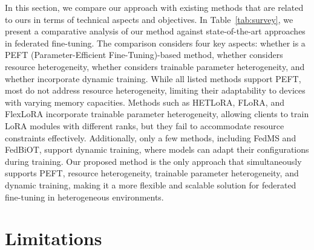 \documentclass[sigconf]{acmart}
\begin{document}
In this section, we compare our approach with existing methods that are related to ours in terms of technical aspects and objectives.
%
%
%
In Table~\ref{tab:survey}, we present a comparative analysis of our method against state-of-the-art approaches in federated fine-tuning. The comparison considers four key aspects: whether is a PEFT (Parameter-Efficient Fine-Tuning)-based method, whether considers resource heterogeneity, whether considers trainable parameter heterogeneity, and whether incorporate dynamic training. While all listed methods support PEFT, most do not address resource heterogeneity, limiting their adaptability to devices with varying memory capacities. Methods such as HETLoRA, FLoRA, and FlexLoRA incorporate trainable parameter heterogeneity, allowing clients to train LoRA modules with different ranks, but they fail to accommodate resource constraints effectively. Additionally, only a few methods, including FedMS and FedBiOT, support dynamic training, where models can adapt their configurations during training. Our proposed method is the only approach that simultaneously supports PEFT, resource heterogeneity, trainable parameter heterogeneity, and dynamic training, making it a more flexible and scalable solution for federated fine-tuning in heterogeneous environments.

\section{Limitations}\label{sec:appendix-limitation}
\end{document}
